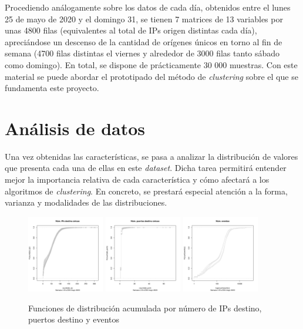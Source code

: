 Procediendo análogamente sobre los datos de cada día, obtenidos entre el lunes 25 de mayo de 2020 y el domingo 31,
se tienen 7 matrices de 13 variables por unas 4800 filas (equivalentes al total de IPs origen distintas cada día),
apreciándose un descenso de la cantidad de orígenes únicos en torno al fin de semana
(4700 filas distintas el viernes y alrededor de 3000 filas tanto sábado como domingo).
En total, se dispone de prácticamente 30 000 muestras.
Con este material se puede abordar el prototipado del método de \emph{clustering} sobre el que se fundamenta este proyecto.

\section{Análisis de datos}\label{sec:analisisdedatos}

Una vez obtenidas las características, se pasa a analizar la distribución de valores que presenta cada una de ellas en este \emph{dataset}.
Dicha tarea permitirá entender mejor la importancia relativa de cada característica y cómo afectará a los algoritmos de \emph{clustering}.
En concreto, se prestará especial atención a la forma, varianza y modalidades de las distribuciones.

\begin{figure}[h]
    \centering
    \includegraphics[width=0.3\textwidth]{../figures/ecdf-count_dst_ip.pdf}
    \includegraphics[width=0.3\textwidth]{../figures/ecdf-count_dst_port.pdf}
    \includegraphics[width=0.3\textwidth]{../figures/ecdf-count_events.pdf}
    \caption{Funciones de distribución acumulada por número de IPs destino, puertos destino y eventos}
    \label{fig:ecdfcountdstip}
\end{figure}

